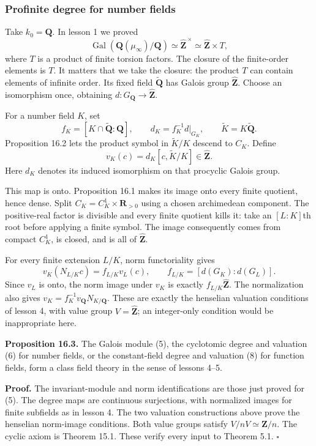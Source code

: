 \documentclass[11pt,a4paper]{article}
\begin{document}
\subsubsection{Profinite degree for number
fields}\label{profinite-degree-for-number-fields}

Take \(k_0=\mathbf Q\). In lesson 1 we proved \[
\operatorname{Gal}(\mathbf Q(\mu_\infty)/\mathbf Q)
\simeq\widehat{\mathbf Z}^{\,\times}
\simeq\widehat{\mathbf Z}\times T,
\] where \(T\) is a product of finite torsion factors. The closure of
the finite-order elements is \(T\). It matters that we take the closure:
the product \(T\) can contain elements of infinite order. Its fixed
field \(\widetilde{\mathbf Q}\) has Galois group
\(\widehat{\mathbf Z}\). Choose an isomorphism once, obtaining
\(d:G_{\mathbf Q}\to\widehat{\mathbf Z}\).

For a number field \(K\), set \[
f_K=[K\cap\widetilde{\mathbf Q}:\mathbf Q],
\qquad d_K=f_K^{-1}d|_{G_K},
\qquad\widetilde K=K\widetilde{\mathbf Q}.
\] Proposition 16.2 lets the product symbol in \(\widetilde K/K\)
descend to \(C_K\). Define \[
v_K(c)=d_K[c,\widetilde K/K]\in\widehat{\mathbf Z}.
\tag{6}
\] Here \(d_K\) denotes its induced isomorphism on that procyclic Galois
group.

This map is onto. Proposition 16.1 makes its image onto every finite
quotient, hence dense. Split \(C_K=C_K^1\times\mathbf R_{>0}\) using a
chosen archimedean component. The positive-real factor is divisible and
every finite quotient kills it: take an \([L:K]\)th root before applying
a finite symbol. The image consequently comes from compact \(C_K^1\), is
closed, and is all of \(\widehat{\mathbf Z}\).

For every finite extension \(L/K\), norm functoriality gives \[
v_K(N_{L/K}c)=f_{L/K}v_L(c),
\qquad
f_{L/K}=[d(G_K):d(G_L)].
\tag{7}
\] Since \(v_L\) is onto, the norm image under \(v_K\) is exactly
\(f_{L/K}\widehat{\mathbf Z}\). The normalization also gives
\(v_K=f_K^{-1}v_{\mathbf Q}N_{K/\mathbf Q}\). These are exactly the
henselian valuation conditions of lesson 4, with value group
\(V=\widehat{\mathbf Z}\); an integer-only condition would be
inappropriate here.

\textbf{Proposition 16.3.} The Galois module (5), the cyclotomic degree
and valuation (6) for number fields, or the constant-field degree and
valuation (8) for function fields, form a class field theory in the
sense of lessons 4--5.

\textbf{Proof.} The invariant-module and norm identifications are those
just proved for (5). The degree maps are continuous surjections, with
normalized images for finite subfields as in lesson 4. The two valuation
constructions above prove the henselian norm-image conditions. Both
value groups satisfy \(V/nV\simeq\mathbf Z/n\). The cyclic axiom is
Theorem 15.1. These verify every input to Theorem 5.1. \(\square\)
\end{document}
